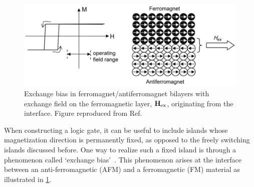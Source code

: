 \documentclass[11pt,a4paper,english,twoside]{article}
\begin{document}
\begin{figure}[b!]
    \centering
    \includegraphics[width=0.8\columnwidth]{Figures/Introduction/Syallabus_PoAEaPD - Figure 2.7.png}
    \caption{Exchange bias in ferromagnet/antiferromagnet bilayers with exchange field on the ferromagnetic layer, $\vb{H_\mathrm{ex}}$, originating from the interface. Figure reproduced from Ref.~\cite{syllabus_PoAEaPD,Syllabus_PoAEaPD_C2_Ref1}}
    \label{fig:Intro_ExchangeBias}
\end{figure}
When constructing a logic gate, it can be useful to include islands whose magnetization direction is permanently fixed, as opposed to the freely switching islands discussed before. One way to realize such a fixed island is through a phenomenon called `exchange bias'~\cite{ExchangeBias_Mechanisms,ExchangeBias_nanostructures,ExchangeBias,syllabus_PoAEaPD}. This phenomenon arises at the interface between an anti-ferromagnetic (AFM) and a ferromagnetic (FM) material as illustrated in \cref{fig:Intro_ExchangeBias}.
\end{document}
